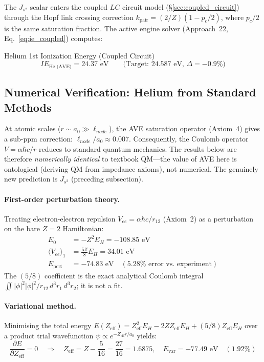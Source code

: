 The $J_{s^2}$ scalar enters the coupled $LC$ circuit model (\S\ref{sec:coupled_circuit}) through the Hopf link crossing correction $k_{\text{pair}} = (2/Z)(1 - p_c/2)$, where $p_c/2$ is the same saturation fraction. The active engine solver (Approach~22, Eq.~\ref{eq:ie_coupled}) computes:
\begin{resultbox}{Helium 1st Ionization Energy (Coupled Circuit)}
\begin{equation}
    IE_\text{He (AVE)} = 24.37\text{ eV} \qquad \text{(Target: } 24.587\text{ eV, } \Delta = -0.9\%\text{)}
\end{equation}
\end{resultbox}

\subsection{Numerical Verification: Helium from Standard Methods}
\label{sec:helium_numerical_verification}

At atomic scales ($r \sim a_0 \gg \ell_{node}$), the AVE saturation operator (Axiom~4) gives a sub-ppm correction: $\ell_{node} / a_0 \approx 0.007$.  Consequently, the Coulomb operator $V = \alpha \hbar c / r$ reduces to standard quantum mechanics.  The results below are therefore \emph{numerically identical} to textbook QM---the value of AVE here is ontological (deriving QM from impedance axioms), not numerical.  The genuinely new prediction is $J_{s^2}$ (preceding subsection).

\paragraph{First-order perturbation theory.}
Treating electron-electron repulsion $V_{ee} = \alpha \hbar c / r_{12}$ (Axiom~2) as a perturbation on the bare $Z{=}2$ Hamiltonian:
\begin{align}
    E_0 &= -Z^2 E_H = -108.85 \text{ eV} \\
    \langle V_{ee} \rangle_1 &= \frac{5Z}{8} E_H = 34.01 \text{ eV} \\
    E_\text{pert} &= -74.83 \text{ eV} \quad (5.28\%\text{ error vs.\ experiment})
\end{align}
The $(5/8)$ coefficient is the exact analytical Coulomb integral $\iint |\phi|^2 |\phi|^2 / r_{12}\, d^3r_1\, d^3r_2$; it is not a fit.

\paragraph{Variational method.}
Minimising the total energy $E(Z_\text{eff}) = Z_\text{eff}^2 E_H - 2Z Z_\text{eff} E_H + (5/8) Z_\text{eff} E_H$ over a product trial wavefunction $\psi \propto e^{-Z_\text{eff} r / a_0}$ yields:
\begin{equation}
    \frac{\partial E}{\partial Z_\text{eff}} = 0 \quad \Longrightarrow \quad
    Z_\text{eff} = Z - \frac{5}{16} = \frac{27}{16} = 1.6875, \quad
    E_\text{var} = -77.49 \text{ eV} \quad (1.92\%)
\end{equation}

